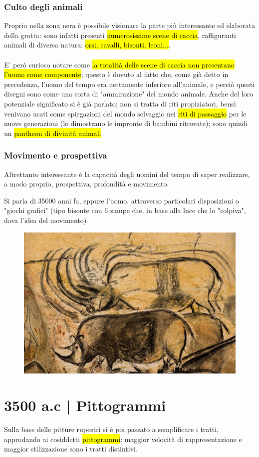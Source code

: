     \subsubsection{Culto degli animali}
    Proprio nella zona nera è possibile visionare la parte più interessante ed elaborata della grotta: sono infatti presenti \hl{numerosissime scene di caccia}, raffiguranti animali di diversa natura: \hl{orsi, cavalli, bisonti, leoni...}.
    \\\\ E' però curioso notare come \hl{la totalità delle scene di caccia non presentano l'uomo come componente}; questo è dovuto al fatto che, come già detto in precedenza, l'uomo del tempo era nettamente inferiore all'animale, e perciò questi disegni sono come una sorta di "ammirazione" del mondo animale. Anche del loro potenziale significato si è già parlato: non si tratta di riti propiziatori, bensì venivano usati come spiegazioni del mondo selvaggio nei \hl{riti di passaggio} per le nuove generazioni (lo dimostrano le impronte di bambini ritrovate); sono quindi un \hl{pantheon di divinità animali}
    \subsubsection{Movimento e prospettiva}
    Altrettanto interessante è la capacità degli uomini del tempo di saper realizzare, a modo proprio, prospettiva, profondità e movimento.

    Si parla di 35000 anni fa, eppure l'uomo, attraverso particolari disposizioni o "giochi grafici" (tipo bisonte con 6 zampe che, in base alla luce che lo "colpiva", dava l'idea del movimento)
    \begin{figure}[H]
    \centering
    \includegraphics[width=0.4\linewidth]{lezione_3/imgs/la-grotta-chauvet-il-piu-antico-esempio-di-arte-preistorica-del-mondo-prende-vita-con-la-realta-virtuale_07.jpg}
\end{figure}
    
\section{3500 a.c | Pittogrammi}
Sulla base delle pitture rupestri si è poi passato a semplificare i tratti, approdando ai cosiddetti \hl{pittogrammi}: maggior velocità di rappresentazione e maggior stilizzazione sono i tratti distintivi.

